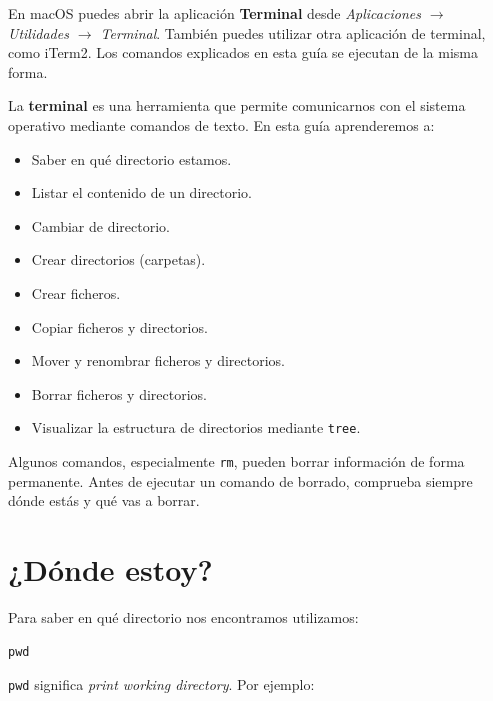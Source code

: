 \documentclass[11pt,a4paper]{article}
\begin{document}
\begin{macos}
En macOS puedes abrir la aplicación \textbf{Terminal} desde
\textit{Aplicaciones $\rightarrow$ Utilidades $\rightarrow$ Terminal}.
También puedes utilizar otra aplicación de terminal, como iTerm2. Los
comandos explicados en esta guía se ejecutan de la misma forma.
\end{macos}




La \textbf{terminal} es una herramienta que permite comunicarnos con el sistema operativo mediante comandos de texto. En esta guía aprenderemos a:


\begin{itemize}
    \item Saber en qué directorio estamos.
    \item Listar el contenido de un directorio.
    \item Cambiar de directorio.
    \item Crear directorios (carpetas).
    \item Crear ficheros.
    \item Copiar ficheros y directorios.
    \item Mover y renombrar ficheros y directorios.
    \item Borrar ficheros y directorios.
    \item Visualizar la estructura de directorios mediante
          \texttt{tree}.
\end{itemize}


\begin{peligro}
Algunos comandos, especialmente \texttt{rm}, pueden borrar
información de forma permanente. Antes de ejecutar un comando
de borrado, comprueba siempre dónde estás y qué vas a borrar.
\end{peligro}


\section{¿Dónde estoy?}


Para saber en qué directorio nos encontramos utilizamos:


\begin{lstlisting}
pwd
\end{lstlisting}


\noindent \texttt{pwd} significa \textit{print working directory}. Por ejemplo:
\end{document}
